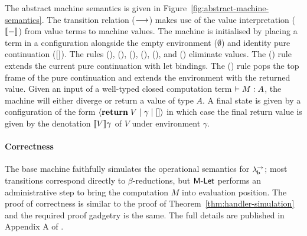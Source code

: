 \documentclass[12pt,phd,lfcs,twoside,openright,logo,leftchapter,normalheadings]{infthesis}
\theoremstyle{plain}
\theoremstyle{definition}
\begin{document}
The abstract machine semantics is given in
Figure~\ref{fig:abstract-machine-semantics}.
%
The transition relation ($\longrightarrow$) makes use of the value
interpretation ($\val{-}$) from value terms to machine values.
%
The machine is initialised by placing a term in a configuration
alongside the empty environment ($\emptyset$) and identity
pure continuation ($[]$).
%
The rules (), (), (),
(), (), and () eliminate values.
%
The () rule extends the current pure continuation with let
bindings.
%
The () rule pops the top frame of the pure continuation
and extends the environment with the returned value.
%
Given an input of a well-typed closed computation term $\vdash M :
  A$, the machine will either diverge or return a value of type $A$.
%
A final state is given by a configuration of the form $\langle \mathbf{return}\;V
  \mid \gamma \mid [] \rangle$ in which case the final return value is given
by the denotation $\llbracket V \rrbracket \gamma$ of $V$ under environment $\gamma$.
%

\paragraph{Correctness}
%
The base machine faithfully simulates the operational semantics for
$\lambda^\rightarrow_{\mathsf{b}}$; most transitions correspond directly to $\beta$-reductions,
but $\mathsf{M\textrm{-}Let}$ performs an administrative step to bring the
computation $M$ into evaluation position.
%
The proof of correctness is similar to the proof of
Theorem~\ref{thm:handler-simulation} and the required proof gadgetry
is the same. The full details are published in Appendix A of
\citet{HillerstromLL20a}.
%
\newcommand{\contapp}[2]{#1 #2}
\newcommand{\contappp}[2]{#1(#2)}
\end{document}
